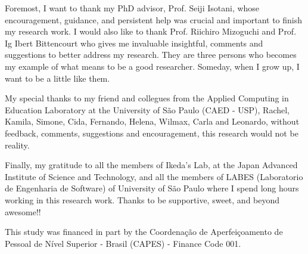 
Foremost, I want to thank my PhD advisor, Prof. Seiji Isotani, whose encouragement, guidance, and persistent help was crucial and important to finish my research work.
I would also like to thank Prof. Riichiro Mizoguchi and Prof. Ig Ibert Bittencourt who gives me invaluable insightful, comments and suggestions to better address my research.
They are three persons who becomes my example of what means to be a good researcher. Someday, when I grow up, I want to be a little like them.

My special thanks to my friend and collegues from the Applied Computing in Education Laboratory at the University of São Paulo (CAED - USP), Rachel, Kamila, Simone, Cida, Fernando, Helena, Wilmax, Carla and Leonardo, without feedback, comments, suggestions and encouragement, this research would not be reality.

Finally, my gratitude to all the members of Ikeda's Lab, at the Japan Advanced Institute of Science and Technology, and all the members of LABES (Laboratorio de Engenharia de Software) of University of São Paulo where I spend long hours working in this research work. Thanks to be supportive, sweet, and beyond awesome!!

This study was financed in part by the Coordenação de Aperfeiçoamento de Pessoal de Nível Superior - Brasil (CAPES) - Finance Code 001.
